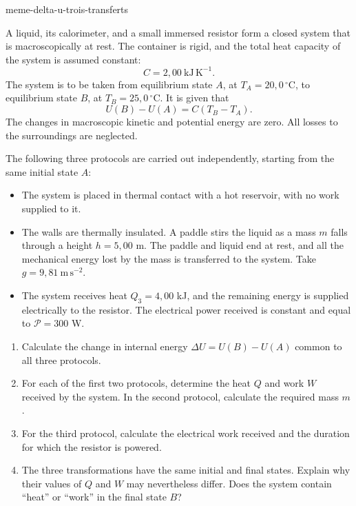 \begin{exo}{meme-delta-u-trois-transferts}

A liquid, its calorimeter, and a small immersed resistor form a closed system
that is macroscopically at rest. The container is rigid, and the total heat
capacity of the system is assumed constant:
\[
C=2{,}00\ \mathrm{kJ\,K^{-1}}.
\]
The system is to be taken from equilibrium state $A$, at
$T_A=20{,}0\,^\circ\mathrm{C}$, to equilibrium state $B$, at
$T_B=25{,}0\,^\circ\mathrm{C}$. It is given that
\[
U(B)-U(A)=C(T_B-T_A).
\]
The changes in macroscopic kinetic and potential energy are zero. All losses
to the surroundings are neglected.

The following three protocols are carried out independently, starting from
the same initial state $A$:
\begin{itemize}
\item[Protocol 1] The system is placed in thermal contact with a hot reservoir,
with no work supplied to it.
\item[Protocol 2] The walls are thermally insulated. A paddle stirs the liquid
as a mass $m$ falls through a height $h=5{,}00$ m. The paddle and liquid end
at rest, and all the mechanical energy lost by the mass is transferred to the
system. Take $g=9{,}81\ \mathrm{m\,s^{-2}}$.
\item[Protocol 3] The system receives heat $Q_3=4{,}00$ kJ, and the remaining
energy is supplied electrically to the resistor. The electrical power received
is constant and equal to $\mathcal P=300$ W.
\end{itemize}

\begin{enumerate}
\item Calculate the change in internal energy $\Delta U=U(B)-U(A)$ common to all three protocols.
\item For each of the first two protocols, determine the heat $Q$ and work $W$ received by the system. In the second protocol, calculate the required mass $m$.
\item For the third protocol, calculate the electrical work received and the duration for which the resistor is powered.
\item The three transformations have the same initial and final states. Explain why their values of $Q$ and $W$ may nevertheless differ. Does the system contain ``heat'' or ``work'' in the final state $B$?
\end{enumerate}


\end{exo}
